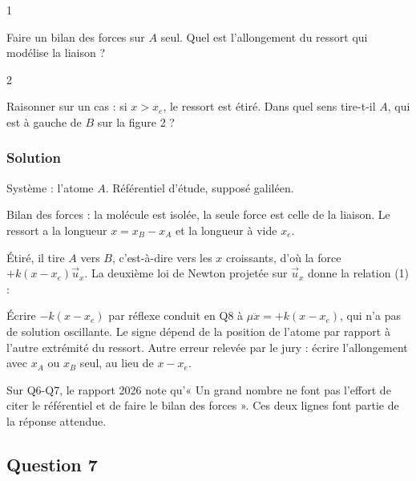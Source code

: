 \documentclass[11pt,a4paper]{article}
\newcommand{\equationajustee}[1]{%
  \sbox{\boiteequation}{$\displaystyle #1$}%
  \ifdim\wd\boiteequation>\linewidth
    \[\resizebox{\linewidth}{!}{\usebox{\boiteequation}}\]%
  \else
    \[#1\]%
  \fi}
\begin{document}
\begin{indication}{1}

Faire un bilan des forces sur \(A\) seul. Quel est l'allongement du ressort qui modélise la liaison ?

\end{indication}

\begin{indication}{2}

Raisonner sur un cas : si \(x>x_e\), le ressort est étiré. Dans quel sens tire-t-il \(A\), qui est à gauche de \(B\) sur la figure 2 ?

\end{indication}

\hypertarget{solution-5}{%
\subsubsection{Solution}\label{solution-5}}

Système : l'atome \(A\). Référentiel d'étude, supposé galiléen.

Bilan des forces : la molécule est isolée, la seule force est celle de la liaison. Le ressort a la longueur \(x=x_B-x_A\) et la longueur à vide \(x_e\).

Étiré, il tire \(A\) vers \(B\), c'est-à-dire vers les \(x\) croissants, d'où la force \(+k(x-x_e)\vec u_x\). La deuxième loi de Newton projetée sur \(\vec u_x\) donne la relation (1) :
\equationajustee{\boxed{m_A\ddot x_A=k(x-x_e)}}

\begin{piege}

Écrire \(-k(x-x_e)\) par réflexe conduit en Q8 à \(\mu\ddot x=+k(x-x_e)\), qui n'a pas de solution oscillante. Le signe dépend de la position de l'atome par rapport à l'autre extrémité du ressort. Autre erreur relevée par le jury : écrire l'allongement avec \(x_A\) ou \(x_B\) seul, au lieu de \(x-x_e\).

\end{piege}

\begin{jury}

Sur Q6-Q7, le rapport 2026 note qu'« Un grand nombre ne font pas l'effort de citer le référentiel et de faire le bilan des forces ». Ces deux lignes font partie de la réponse attendue.

\end{jury}

\hypertarget{question-7}{%
\subsection{Question 7}\label{question-7}}
\end{document}
